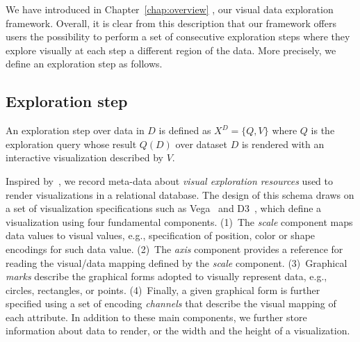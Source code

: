 \label{sec:evo-core}

We have introduced in Chapter~\ref{chap:overview} \framework{}, our visual data exploration framework. Overall, it is clear from this description that our framework \framework{} offers users the possibility to perform a set of consecutive exploration steps where they explore visually at each step a different region of the data. More precisely, we define an exploration step as follows. 

  \subsection{Exploration step}     
  \label{subsec:explorStep}
\begin{definition} 
\label{def:expo-step}An exploration step over data in $D$ is defined as $X^D=\{Q,V\}$ where $Q$ is the exploration query whose result $Q(D)$ over dataset $D$ is rendered with an interactive visualization described by $V$. 
\end{definition}


 
 Inspired by~\cite{WuPMZR17}, we record meta-data about \emph{visual exploration resources} used to render visualizations in a relational database. The design of this schema draws on a set of visualization specifications such as Vega~\cite{vega17} and D3~\cite{2011-d3}, which define a visualization using four fundamental components. (1)~The \emph{scale} component maps data values to visual values, e.g., specification of position, color or shape encodings for such data value. (2)~The \emph{axis} component provides a reference for reading the visual/data mapping defined by the \emph{scale} component. (3)~Graphical \emph{marks} describe the graphical forms adopted to visually represent data, e.g., circles, rectangles, or points. (4)~Finally, a given graphical form is further specified using a set of encoding \emph{channels} that describe the visual mapping of each attribute.  In addition to these main components, we further store information about data to render, or the width and the height of a visualization. 
 

\sloppy

